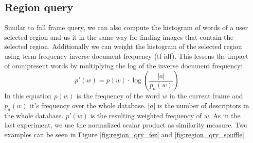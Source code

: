 \documentclass{paper}
\begin{document}
\subsection{Region query}
Similar to full frame query, we can also compute the histogram of words of a user 
selected region and us it in the same way for finding images that contain the 
selected region. Additionally we can weight the histogram of the selected region
using term frequency inverse document frequency (tf-idf). This lessens the impact
of omnipresent words by multiplying the log of the inverse document frequency:
\begin{equation}
	p'(w) = p(w) \cdot \log(\frac{|a|}{p_a(w)})
\end{equation}
In this equation $p(w)$ is the frequency of the word $w$ in the current frame and $p_a(w)$
 it's frequency over the whole database. $|a|$ is the number of descriptors in the 
 whole database. $p'(w)$ is the resulting weighted frequency of $w$.
 As in the last experiment, we use the normalized scalar product as similarity measure.
Two examples can be seen in Figure \ref{fig:region_qry_fez} and \ref{fig:region_qry_souffle}
\end{document}
